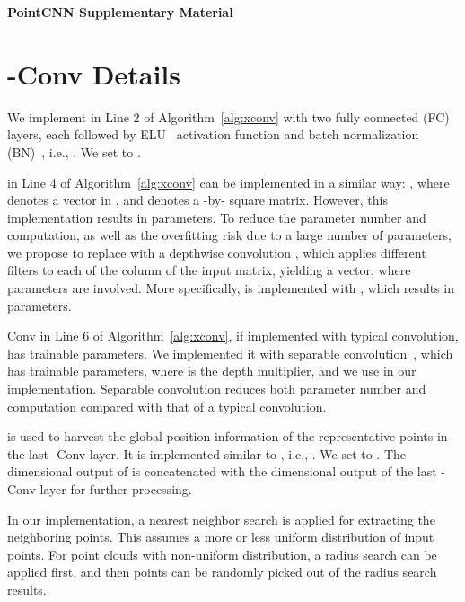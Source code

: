 \documentclass{article}
\begin{document}
\small
\begingroup
	\setlength{\bibsep}{1pt}
	
	
\endgroup

\clearpage
\begin{center}
\textbf{\large PointCNN Supplementary Material}
\end{center}
\setcounter{section}{0}
\setcounter{equation}{0}
\setcounter{figure}{0}
\setcounter{table}{0}
\setcounter{page}{1}
\makeatletter

\section{-Conv Details}
\label{sec:xconv_details}

We implement  in Line 2 of Algorithm~\ref{alg:xconv} with two fully connected (FC) layers, each followed by ELU~\cite{Clevert_ICLR16} activation function and batch normalization (BN)~\cite{Ioffe_ICML15}, i.e., . We set  to .

 in Line 4 of Algorithm~\ref{alg:xconv} can be implemented in a similar way: , where  denotes a vector in , and  denotes a -by- square matrix. However, this implementation results in  parameters. To reduce the parameter number and computation, as well as the overfitting risk due to a large number of parameters, we propose to replace  with a depthwise convolution , which applies  different filters to each of the  column of the input  matrix, yielding a  vector, where  parameters are involved. More specifically,  is implemented with , which results in  parameters.

Conv in Line 6 of Algorithm~\ref{alg:xconv}, if implemented with typical convolution, has  trainable parameters. We implemented it with separable convolution~\cite{chollet2016xception}, which has  trainable parameters, where  is the depth multiplier, and we use  in our implementation. Separable convolution reduces both parameter number and computation compared with that of a typical convolution.

 is used to harvest the global position information of the representative points in the last -Conv layer. It is implemented similar to , i.e., . We set  to . The  dimensional output of  is concatenated with the  dimensional output of the last -Conv layer for further processing.

In our implementation, a  nearest neighbor search is applied for extracting the  neighboring points. This assumes a more or less uniform distribution of input points. For point clouds with non-uniform distribution, a radius search can be applied first, and then  points can be randomly picked out of the radius search results.
\end{document}
